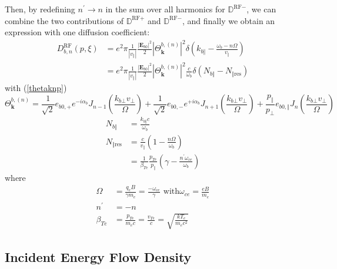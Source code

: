 Then, by redefining $n^{\prime}\rightarrow n$ in the sum over all harmonics
for $\mathbb{{D}}^{\text{RF}-}$, we can combine the two contributions of
$\mathbb{{D}}^{\text{RF}+}$ and $\mathbb{{D}}^{\text{RF}-}$, and finally we
obtain an expression with one diffusion coefficient:\qquad\qquad\qquad\qquad%
\begin{align}
D_{b,n}^{\text{RF}}(p,\xi)  &  =e^{2}\pi\frac{1}{\left|  v_{\Vert}\right|
}\frac{\left|  \mathbf{E}_{b0}\right|  ^{2}}{2}\left|  \Theta_{\mathbf{k}%
}^{b,\left(  n\right)  }\right|  ^{2}\delta\left(  k_{b\Vert}-\frac{\omega
_{b}-n\Omega}{v_{\Vert}}\right) \nonumber\\
&  =e^{2}\pi\frac{1}{\left|  v_{\Vert}\right|  }\frac{\left|  \mathbf{E}%
_{b0}\right|  ^{2}}{2}\left|  \Theta_{\mathbf{k}}^{b,\left(  n\right)
}\right|  ^{2}\frac{c}{\omega_{b}}\delta\left(  N_{b\Vert}-N_{\Vert\text{res}%
}\right)  \label{diffcoef}%
\end{align}
with (\ref{thetaknp})%
\begin{equation}
\Theta_{\mathbf{k}}^{b,\left(  n\right)  }=\frac{1}{\sqrt{2}}e_{b0,+}%
e^{-i\alpha_{b}}J_{n-1}\left(  \frac{k_{b\bot}v_{\bot}}{\Omega}\right)
+\frac{1}{\sqrt{2}}e_{b0,-}e^{+i\alpha_{b}}J_{n+1}\left(  \frac{k_{b\bot
}v_{\bot}}{\Omega}\right)  +\frac{p_{\Vert}}{p_{\bot}}e_{b0,\Vert}J_{n}\left(
\frac{k_{b\bot}v_{\bot}}{\Omega}\right)  \label{thetakn}%
\end{equation}%
\begin{align}
N_{b\Vert}  &  =\frac{k_{b\Vert}c}{\omega_{b}}\\
N_{\Vert\text{res}}  &  =\frac{c}{v_{\Vert}}\left(  1-\frac{n\Omega}%
{\omega_{b}}\right) \nonumber\\
&  =\frac{1}{\beta_{Te}}\frac{p_{Te}}{p_{\Vert}}\left(  \gamma-\frac
{n^{\prime}\omega_{ce}}{\omega_{b}}\right)  \label{nparres}%
\end{align}
where
\begin{align}
\Omega &  =\frac{q_{e}B}{\gamma m_{e}}=\frac{-\omega_{ce}}{\gamma}\text{ with
}\omega_{ce}=\frac{eB}{m_{e}}\\
n^{\prime}  &  =-n\\
\beta_{Te}  &  =\frac{p_{Te}}{m_{e}c}=\frac{v_{Te}}{c}=\sqrt{\frac{kT_{e}%
}{m_{e}c^{2}}}%
\end{align}

\subsection{Incident Energy Flow Density}

